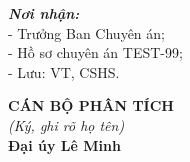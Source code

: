 \documentclass[12pt,a4paper]{article}
\begin{document}
\vspace{0.8cm}

\noindent
\begin{minipage}[t]{0.45\textwidth}
    \small
    \textbf{\textit{Nơi nhận:}}\\
    - Trưởng Ban Chuyên án;\\
    - Hồ sơ chuyên án TEST-99;\\
    - Lưu: VT, CSHS.
\end{minipage}
\hfill
\begin{minipage}[t]{0.5\textwidth}
    \begin{center}
        \small
        \textbf{CÁN BỘ PHÂN TÍCH}\\
        \textit{(Ký, ghi rõ họ tên)}\\[1.5cm]
        \textbf{Đại úy Lê Minh}
    \end{center}
\end{minipage}
\end{document}
